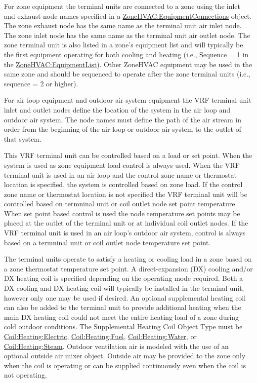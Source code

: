 For zone equipment the terminal units are connected to a zone using the inlet and exhaust node names specified in a \hyperref[zonehvacequipmentconnections]{ZoneHVAC:EquipmentConnections} object. The zone exhaust node has the same name as the terminal unit air inlet node. The zone inlet node has the same name as the terminal unit air outlet node. The zone terminal unit is also listed in a zone's equipment list and will typically be the first equipment operating for both cooling and heating (i.e., Sequence = 1 in the \hyperref[zonehvacequipmentlist]{ZoneHVAC:EquipmentList}). Other ZoneHVAC equipment may be used in the same zone and should be sequenced to operate after the zone terminal units (i.e., sequence = 2 or higher).

For air loop equipment and outdoor air system equipment the VRF terminal unit inlet and outlet nodes define the location of the system in the air loop and outdoor air system. The node names must define the path of the air stream in order from the beginning of the air loop or outdoor air system to the outlet of that system.

This VRF terminal unit can be controlled based on a load or set point. When the system is used as zone equipment load control is always used. When the VRF terminal unit is used in an air loop and the control zone name or thermostat location is specified, the system is controlled based on zone load. If the control zone name or thermostat location is not specified the VRF terminal unit will be controlled based on termninal unit or coil outlet node set point temperature. When set point based control is used the node temperature set points may be placed at the outlet of the terminal unit or at individual coil outlet nodes. If the VRF terminal unit is used in an air loop's outdoor air system, control is always based on a termninal unit or coil outlet node temperature set point. 

The terminal units operate to satisfy a heating or cooling load in a zone based on a zone thermostat temperature set point. A direct-expansion (DX) cooling and/or DX heating coil is specified depending on the operating mode required. Both a DX cooling and DX heating coil will typically be installed in the terminal unit, however only one may be used if desired. An optional supplemental heating coil can also be added to the terminal unit to provide additional heating when the main DX heating coil could not meet the entire heating load of a zone during cold outdoor conditions. The Supplemental Heating Coil Object Type must be \hyperref[coilheatingelectric]{Coil:Heating:Electric}, \hyperref[coilheatinggas-000]{Coil:Heating:Fuel}, \hyperref[coilheatingwater]{Coil:Heating:Water}, or \hyperref[coilheatingsteam]{Coil:Heating:Steam}. Outdoor ventilation air is modeled with the use of an optional outside air mixer object. Outside air may be provided to the zone only when the coil is operating or can be supplied continuously even when the coil is not operating.


